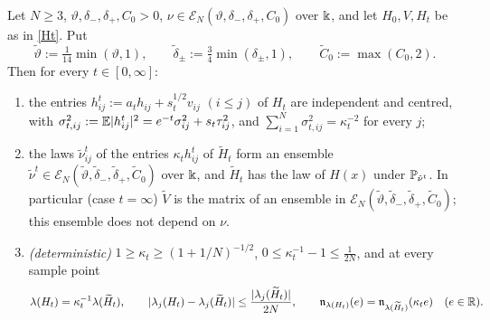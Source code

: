 \begin{lemma}\label{lem:U11}
Let $N\ge3$, $\vartheta,\delta_-,\delta_+,C_0>0$, $\nu\in\mathcal E_N(\vartheta,\delta_-,\delta_+,C_0)$ over $\Bbbk$, and let $H_0,V,H_t$ be as in \eqref{Ht}. Put
\begin{equation*}
\tilde\vartheta:=\tfrac1{14}\min(\vartheta,1),\qquad\tilde\delta_\pm:=\tfrac34\min(\delta_\pm,1),\qquad\tilde C_0:=\max(C_0,2).
\end{equation*}
Then for every $t\in[0,\infty]$:
\begin{enumerate}[label=(\alph*),itemsep=1pt]
\item the entries $h^t_{ij}:=a_th_{ij}+s_t^{1/2}v_{ij}$ $(i\le j)$ of $H_t$ are independent and centred, with
$\sigma_{t,ij}^2:=\mathbb{E}|h^t_{ij}|^2=e^{-t}\sigma_{ij}^2+s_t\tau_{ij}^2$, and $\sum_{i=1}^N\sigma^2_{t,ij}=\kappa_t^{-2}$ for every $j$;
\item the laws $\tilde\nu^t_{ij}$ of the entries $\kappa_th^t_{ij}$ of $\widetilde H_t$ form an ensemble $\tilde\nu^t\in\mathcal E_N(\tilde\vartheta,\tilde\delta_-,\tilde\delta_+,\tilde C_0)$ over $\Bbbk$, and $\widetilde H_t$ has the law of $H(x)$ under $\mathbb{P}_{\tilde\nu^t}$.
In particular (case $t=\infty$) $\widetilde V$ is the matrix of an ensemble in $\mathcal E_N(\tilde\vartheta,\tilde\delta_-,\tilde\delta_+,\tilde C_0)$; this ensemble does not depend on $\nu$.
\item \emph{(deterministic)} $1\ge\kappa_t\ge(1+1/N)^{-1/2}$, $0\le\kappa_t^{-1}-1\le\frac1{2N}$, and at every sample point
\[
\lambda(H_t)=\kappa_t^{-1}\lambda(\widetilde H_t),\qquad |\lambda_j(H_t)-\lambda_j(\widetilde H_t)|\le\frac{|\lambda_j(\widetilde H_t)|}{2N},\qquad \mathfrak{n}_{\lambda(H_t)}(e)=\mathfrak{n}_{\lambda(\widetilde H_t)}(\kappa_te)\quad(e\in\mathbb{R}).
\]
\end{enumerate}
\end{lemma}


